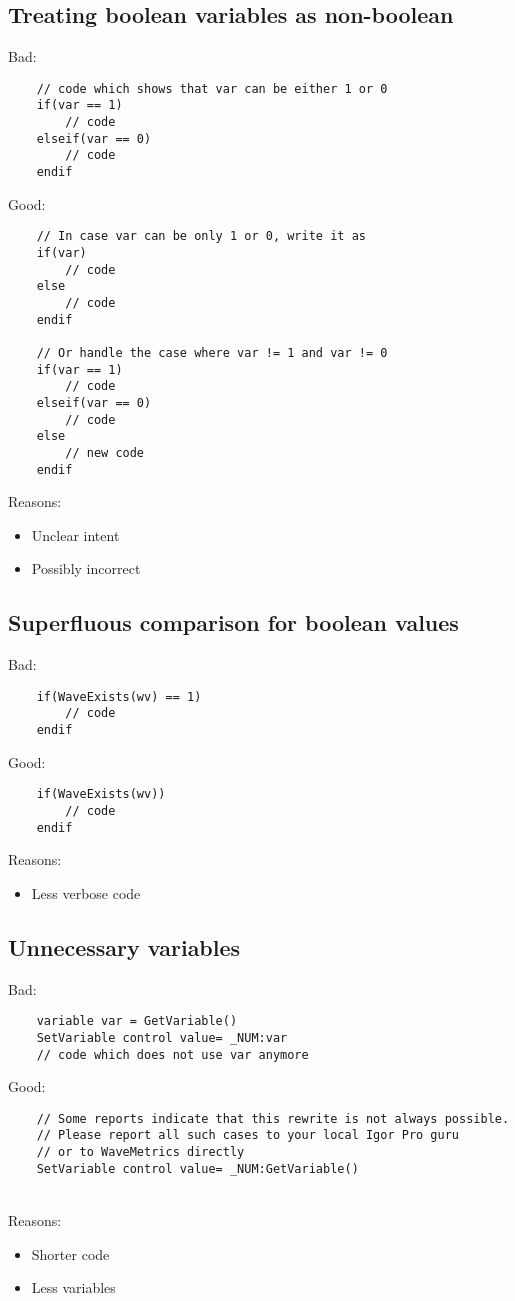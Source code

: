 \documentclass{scrartcl}
\begin{document}
\subsection{Treating boolean variables as non-boolean}
Bad:
\begin{verbatim}
	// code which shows that var can be either 1 or 0
	if(var == 1)
		// code
	elseif(var == 0)
		// code
	endif
\end{verbatim}
Good:
\begin{verbatim}
	// In case var can be only 1 or 0, write it as
	if(var)
		// code
	else
		// code
	endif

	// Or handle the case where var != 1 and var != 0
	if(var == 1)
		// code
	elseif(var == 0)
		// code
	else
		// new code
	endif
\end{verbatim}
Reasons:
\begin{itemize}
	\item Unclear intent
	\item Possibly incorrect
\end{itemize}
%
\subsection{Superfluous comparison for boolean values}
Bad:
\begin{verbatim}
	if(WaveExists(wv) == 1)
		// code
	endif
\end{verbatim}
Good:
\begin{verbatim}
	if(WaveExists(wv))
		// code
	endif
\end{verbatim}
Reasons:
\begin{itemize}
  \item Less verbose code
\end{itemize}
%
\subsection{Unnecessary variables}
Bad:
\begin{verbatim}
	variable var = GetVariable()
	SetVariable control value= _NUM:var
	// code which does not use var anymore
\end{verbatim}
\begin{minipage}{\textwidth}
Good:
\begin{verbatim}
	// Some reports indicate that this rewrite is not always possible.
	// Please report all such cases to your local Igor Pro guru
	// or to WaveMetrics directly
	SetVariable control value= _NUM:GetVariable()
\end{verbatim}
\end{minipage}\\[3ex]
Reasons:
\begin{itemize}
  \item Shorter code
  \item Less variables
\end{itemize}
%
\end{document}
